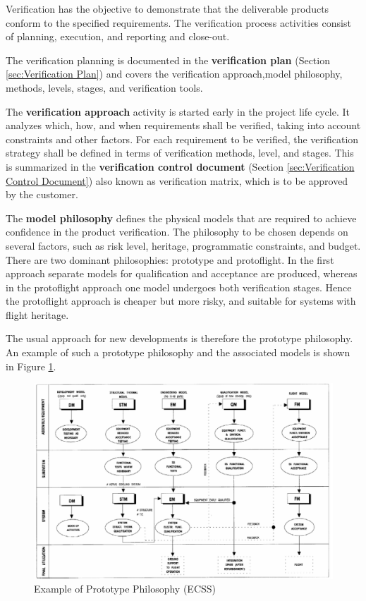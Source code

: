 Verification has the objective to demonstrate that the deliverable products conform to the specified requirements. The verification process activities consist of planning, execution, and reporting and close-out. 

The verification planning is documented in the \textbf{verification plan} (Section \ref{sec:Verification Plan}) and covers the verification approach,model philosophy, methods, levels, stages, and verification tools. 

The \textbf{verification approach} activity is started early in the project life cycle. It analyzes which, how, and when requirements shall be verified, taking into account constraints and other factors. For each requirement to be verified, the verification strategy shall be defined in terms of verification methods, level, and stages. This is summarized in the \textbf{verification control document} (Section \ref{sec:Verification Control Document}) also known as verification matrix, which is to be approved by the customer.

The \textbf{model philosophy} defines the physical models that are required to achieve confidence in the product verification. The philosophy to be chosen depends on several factors, such as risk level, heritage, programmatic constraints, and budget. There are two dominant philosophies: prototype and protoflight. In the first approach separate models for qualification and acceptance are produced, whereas in the protoflight approach one model undergoes both verification stages. Hence the protoflight approach is cheaper but more risky, and suitable for systems with flight heritage.

The usual approach for new developments is therefore the prototype philosophy. An example of such a prototype philosophy and the associated models is shown in Figure \ref{fig:Example of Prototype Philosophy}.

\begin{figure}[h]
\centering\includegraphics[scale=0.4]{fig/example_of_prototype_philosophy}
\caption{Example of Prototype Philosophy (ECSS)}
\label{fig:Example of Prototype Philosophy}
\end{figure}

